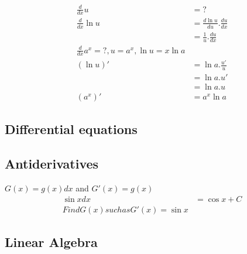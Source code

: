 \documentclass{article}
\begin{document}
                    \begin{align*}
                        \frac{d}{dx} u &= ?\\
                        \frac{d}{dx} \ln u &= \frac{d \ln u}{du} . \frac{du}{dx} \\
                        &= \frac{1}{u}.\frac{du}{dx}\\
                        \frac{d}{dx} a^x = ? , u = a^x , \ln u = x\ln a \\
                        (\ln u)' &= \ln a. \frac{u'}{u}\\
                        &= \ln a . u'\\
                        &= \ln a .u \\
                        (a^x)' &= a^x \ln a
                    \end{align*}

        \subsection{Differential equations}

            \subsection{Antiderivatives}
            \label{sub:Antiderivatives}

            $G(x)= g(x)dx $ and $G'(x)=g(x)$\\

            \begin{align*}
                \sin x dx &= \cos x + C\\
                Find G(x) such as G'(x)= \sin x
            \end{align*}




        \subsection{Linear Algebra}
\end{document}
